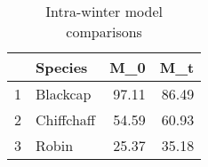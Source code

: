 \begin{table}[ht]
\centering
\begin{tabular}{rlrr}
  \hline
 & Species & M\_0 & M\_t \\ 
  \hline
1 & Blackcap & 97.11 & 86.49 \\ 
  2 & Chiffchaff & 54.59 & 60.93 \\ 
  3 & Robin & 25.37 & 35.18 \\ 
   \hline
\end{tabular}
\caption{Intra-winter model comparisons} 
\label{tab:model_comparison_intra}
\end{table}
